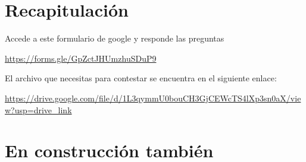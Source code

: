 \documentclass[
]{book}
\begin{document}
\chapter{Recapitulación}\label{recapitulaciuxf3n}

Accede a este formulario de google y responde las preguntas

\url{https://forms.gle/GpZctJHUmzhuSDuP9}

El archivo que necesitas para contestar se encuentra en el siguiente enlace:

\url{https://drive.google.com/file/d/1L3qymmU0bouCH3GjCEWcTS4lXp3sn0aX/view?usp=drive_link}

\chapter{En construcción también}\label{en-construcciuxf3n-tambiuxe9n}
\end{document}
